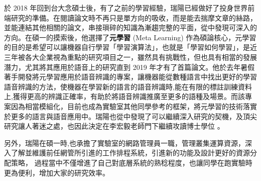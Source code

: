 \documentclass[12pt,UTF8,fntef]{article}
\begin{document}
於 2018 年回到台大念碩士後，有了之前的學習經驗，瑞陽已經做好了投身世界前端研究的準備。在閱讀論文時不再只是單方向的吸收，而是能去揣摩文章的絲路，並能連結其他相關的論文，串接瑣碎的知識為漸趨完整的平面，從中發現可深入的方向。在碩一的摸索後，他選擇了\textbf{元學習} (Meta Learning) 作為碩論核心，元學習的目的是希望可以讓機器自行學習「學習演算法」，也就是「學習如何學習」，是近三年被各大企業視為重點的研究項目之一，雖然具有挑戰性，但也具有相當的發展潛力，尤其將其應用於語音上的研究直到 2019 年才有了首篇論文。他於去年暑假著手開發將元學習應用於語音辨識的專案，讓機器能從數種語言中找出更好的學習語音辨識的方法，使機器在學習新的語言的語音辨識時,能在有限的標註訓練資料上,獲得更高的辨識正確率，有助於將語音辨識推廣至更多的語種及場景。而該專案因為相當模組化，目前也成為實驗室其他同學參考的框架，將元學習的技術落實於更多的語言與語音應用中。瑞陽也從中發現了可以繼續深入研究的契機，及頂尖研究讓人著迷之處，也因此決定在李宏毅老師門下繼續攻讀博士學位
。

\vspace{1.5em}

另外，瑞陽在碩一時,也承擔了實驗室的網路管理員一職，管理叢集運算資源，深入了解並維護前任網管所引進的工作排程系統，引進新的功能及設計更好的資源分配策略，
過程當中不僅增進了自己對底層系統的熟稔程度，也讓同學在跑實驗時更為便利，增加大家的研究效率。
\end{document}

